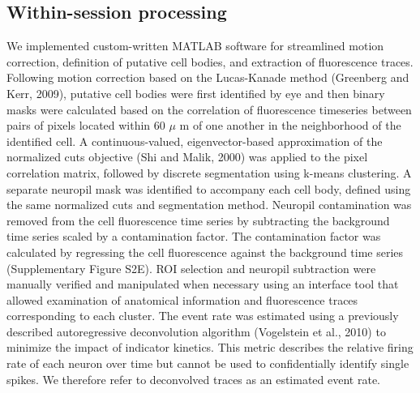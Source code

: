 \subsection{Within-session processing}
We implemented custom-written MATLAB software for streamlined motion correction, definition of putative cell bodies, and extraction of fluorescence traces. Following motion correction based on the Lucas-Kanade method (Greenberg and Kerr, 2009), putative cell bodies were first identified by eye and then binary masks were calculated based on the correlation of fluorescence timeseries between pairs of pixels located within 60 $\mu$ m of one another in the neighborhood of the identified cell. A continuous-valued, eigenvector-based approximation of the normalized cuts objective (Shi and Malik, 2000) was applied to the pixel correlation matrix, followed by discrete segmentation using k-means clustering. A separate neuropil mask was identified to accompany each cell body, defined using the same normalized cuts and segmentation method. Neuropil contamination was removed from the cell fluorescence time series by subtracting the background time series scaled by a contamination factor. The contamination factor was calculated by regressing the cell fluorescence against the background time series (Supplementary Figure S2E). ROI selection and neuropil subtraction were manually verified and manipulated when necessary using an interface tool that allowed examination of anatomical information and fluorescence traces corresponding to each cluster. The event rate was estimated using a previously described autoregressive deconvolution algorithm (Vogelstein et al., 2010) to minimize the impact of indicator kinetics. This metric describes the relative firing rate of each neuron over time but cannot be used to confidentially identify single spikes. We therefore refer to deconvolved traces as an estimated event rate.

